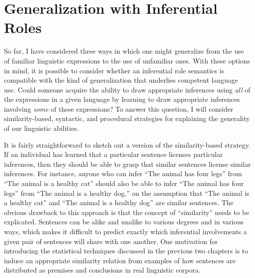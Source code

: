 \section{Generalization with Inferential Roles}

So far, I have considered three ways in which one might generalize from the use of familiar linguistic expressions to the use of unfamiliar ones. With these options in mind, it is possible to consider whether an inferential role semantics is compatible with the kind of generalization that underlies competent language use. Could someone acquire the ability to draw appropriate inferences using \textit{all} of the expressions in a given language by learning to draw appropriate inferences involving \textit{some} of these expressions? To answer this question, I will consider similarity-based, syntactic, and procedural strategies for explaining the generality of our linguistic abilities.

It is fairly straightforward to sketch out a version of the similarity-based strategy. If an individual has learned that a particular sentence licenses particular inferences, then they should be able to grasp that similar sentences license similar inferences. For instance, anyone who can infer ``The animal has four legs'' from ``The animal is a healthy cat'' should also be able to infer ``The animal has four legs'' from ``The animal is a healthy dog,'' on the assumption that ``The animal is a healthy cat'' and ``The animal is a healthy dog'' are similar sentences. The obvious drawback to this approach is that the concept of ``similarity'' needs to be explicated. Sentences can be alike and unalike to various degrees and in various ways, which makes it difficult to predict exactly which inferential involvements a given pair of sentences will share with one another. One motivation for introducing the statistical techniques discussed in the previous two chapters is to induce an appropriate similarity relation from examples of how sentences are distributed as premises and conclusions in real linguistic corpora.

